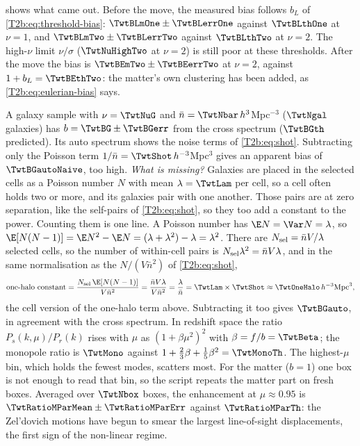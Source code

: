  shows what came out. Before the move, the measured bias follows $b_L$ of \eqref{T2b:eq:threshold-bias}: $\TwtBLmOne\pm\TwtBLerrOne$ against $\TwtBLthOne$ at $\nu=1$, and $\TwtBLmTwo\pm\TwtBLerrTwo$ against $\TwtBLthTwo$ at $\nu=2$. The high-$\nu$ limit $\nu/\sigma$ ($\TwtNuHighTwo$ at $\nu=2$) is still poor at these thresholds. After the move the bias is $\TwtBEmTwo\pm\TwtBEerrTwo$ at $\nu=2$, against $1+b_L=\TwtBEthTwo$: the matter's own clustering has been added, as \eqref{T2b:eq:eulerian-bias} says.

A galaxy sample with $\nu=\TwtNuG$ and $\bar n=\TwtNbar\,h^3$Mpc$^{-3}$ ($\TwtNgal$ galaxies) has $b=\TwtBG\pm\TwtBGerr$ from the cross spectrum ($\TwtBGth$ predicted). Its auto spectrum shows the noise terms of \eqref{T2b:eq:shot}. Subtracting only the Poisson term $1/\bar n=\TwtShot\,h^{-3}$Mpc$^3$ gives an apparent bias of $\TwtBGautoNaive$, too high. \emph{What is missing?} Galaxies are placed in the selected cells as a Poisson number $N$ with mean $\lambda=\TwtLam$ per cell, so a cell often holds two or more, and its galaxies pair with one another. Those pairs are at zero separation, like the self-pairs of \eqref{T2b:eq:shot}, so they too add a constant to the power. Counting them is one line. A Poisson number has $\E N=\Var N=\lambda$, so $\E[N(N-1)]=\E N^2-\E N=(\lambda+\lambda^2)-\lambda=\lambda^2$. There are $N_{\rm sel}=\bar nV/\lambda$ selected cells, so the number of within-cell pairs is $N_{\rm sel}\lambda^2=\bar nV\lambda$, and in the same normalisation as the $N/(V\bar n^2)$ of \eqref{T2b:eq:shot},
\[
  \text{one-halo constant}=\frac{N_{\rm sel}\,\E[N(N-1)]}{V\bar n^2}=\frac{\bar nV\lambda}{V\bar n^2}=\frac{\lambda}{\bar n}=\TwtLam\times\TwtShot\approx\TwtOneHalo\,h^{-3}\text{Mpc}^3 ,
\]
the cell version of the one-halo term above. Subtracting it too gives $\TwtBGauto$, in agreement with the cross spectrum. In redshift space the ratio $P_s(k,\mu)/P_r(k)$ rises with $\mu$ as $(1+\beta\mu^2)^2$ with $\beta=f/b=\TwtBeta$; the monopole ratio is $\TwtMono$ against $1+\frac23\beta+\frac15\beta^2=\TwtMonoTh$. The highest-$\mu$ bin, which holds the fewest modes, scatters most. For the matter ($b=1$) one box is not enough to read that bin, so the script repeats the matter part on fresh boxes. Averaged over $\TwtNbox$ boxes, the enhancement at $\mu\approx0.95$ is $\TwtRatioMParMean\pm\TwtRatioMParErr$ against $\TwtRatioMParTh$: the Zel'dovich motions have begun to smear the largest line-of-sight displacements, the first sign of the non-linear regime.


